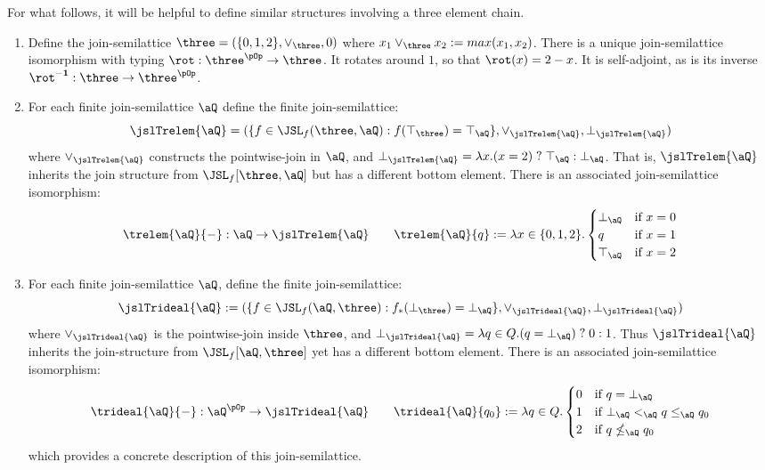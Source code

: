 \documentclass{article}
\begin{document}
\noindent
For what follows, it will be helpful to define similar structures involving a three element chain.

\begin{definition}
\label{def:trelem_trideal}
\item
\begin{enumerate}
\item
Define the join-semilattice $\three = (\{0,1,2\},\lor_\three,0)$ where $x_1 \lor_\three x_2 := max(x_1,x_2)$.  There is a unique join-semilattice isomorphism with typing $\rot : \three^{\pOp} \to \three$. It rotates around $1$, so that $\rot(x) = 2 - x$. It is self-adjoint, as is its inverse $\rot^{\bf-1} : \three \to \three^{\pOp}$.
\item
For each finite join-semilattice $\aQ$ define the finite join-semilattice:
\[
\jslTrelem{\aQ} 
= (\{ f \in \JSL_f(\three,\aQ) : f(\top_\three) = \top_\aQ \},\lor_{\jslTrelem{\aQ}},\bot_{\jslTrelem{\aQ}})
\]
where $\lor_{\jslTrelem{\aQ}}$ constructs the pointwise-join in $\aQ$, and $\bot_{\jslTrelem{\aQ}} = \lambda x. (x = 2) \; ? \; \top_\aQ : \bot_\aQ$. That is, $\jslTrelem{\aQ}$ inherits the join structure from $\JSL_f[\three,\aQ]$ but has a different bottom element. There is an associated join-semilattice isomorphism:
\[
\trelem{\aQ}{-} : \aQ \to \jslTrelem{\aQ}
\qquad
\trelem{\aQ}{q} :=  \lambda x \in \{0,1,2\}.
\begin{cases}
\bot_\aQ & \text{if $x = 0$}
\\
q & \text{if $x = 1$}
\\
\top_\aQ & \text{if $x = 2$}
\end{cases}
\]
\item
For each finite join-semilattice $\aQ$, define the finite join-semilattice:
\[
\jslTrideal{\aQ} 
:= (\{ f \in \JSL_f(\aQ,\three) : f_*(\bot_\three) = \bot_\aQ \},\lor_{\jslTrideal{\aQ}},\bot_{\jslTrideal{\aQ}})
\]
where $\lor_{\jslTrideal{\aQ}}$ is the pointwise-join inside $\three$, and $\bot_{\jslTrideal{\aQ}} = \lambda q \in Q.(q = \bot_\aQ)\;?\;0 : 1$. Thus $\jslTrideal{\aQ}$ inherits the join-structure from $\JSL_f[\aQ,\three]$ yet has a different bottom element.  There is an associated join-semilattice isomorphism:
\[
\trideal{\aQ}{-} : \aQ^{\pOp} \to \jslTrideal{\aQ}
\qquad
\trideal{\aQ}{q_0} := \lambda q \in Q.
\begin{cases}
0 & \text{if $q = \bot_\aQ$}
\\
1 & \text{if $\bot_\aQ <_\aQ q \leq_\aQ q_0$}
\\
2 & \text{if $q \nleq_\aQ q_0$}
\end{cases}
\]
which provides a concrete description of this join-semilattice. \endbox
\end{enumerate}

\end{definition}
\end{document}
